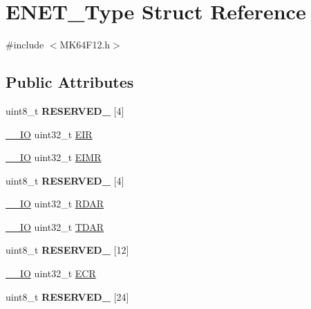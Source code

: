 \hypertarget{structENET__Type}{}\section{E\+N\+E\+T\+\_\+\+Type Struct Reference}
\label{structENET__Type}


{\ttfamily \#include $<$M\+K64\+F12.\+h$>$}

\subsection*{Public Attributes}
\begin{DoxyCompactItemize}
\item 
uint8\+\_\+t {\bfseries R\+E\+S\+E\+R\+V\+E\+D\+\_} \mbox{[}4\mbox{]}\hypertarget{structENET__Type_ad9777da88fb9892bd7c59a0a67fc3da0}{}\label{structENET__Type_ad9777da88fb9892bd7c59a0a67fc3da0}

\item 
\hyperlink{core__sc300_8h_aec43007d9998a0a0e01faede4133d6be}{\+\_\+\+\_\+\+IO} uint32\+\_\+t \hyperlink{structENET__Type_a2ff7649428a079dfb1cc80b9dd6ef26b}{E\+IR}
\item 
\hyperlink{core__sc300_8h_aec43007d9998a0a0e01faede4133d6be}{\+\_\+\+\_\+\+IO} uint32\+\_\+t \hyperlink{structENET__Type_ac8ca6627a6219451b62a04a55177367b}{E\+I\+MR}
\item 
uint8\+\_\+t {\bfseries R\+E\+S\+E\+R\+V\+E\+D\+\_} \mbox{[}4\mbox{]}\hypertarget{structENET__Type_a914cb8e3728f584f7ed798dd59a4c61c}{}\label{structENET__Type_a914cb8e3728f584f7ed798dd59a4c61c}

\item 
\hyperlink{core__sc300_8h_aec43007d9998a0a0e01faede4133d6be}{\+\_\+\+\_\+\+IO} uint32\+\_\+t \hyperlink{structENET__Type_aafd4d2fcc9b52fe5e9fb671cb3cbe8f7}{R\+D\+AR}
\item 
\hyperlink{core__sc300_8h_aec43007d9998a0a0e01faede4133d6be}{\+\_\+\+\_\+\+IO} uint32\+\_\+t \hyperlink{structENET__Type_aa4673b3f5276bced67de7715389a098f}{T\+D\+AR}
\item 
uint8\+\_\+t {\bfseries R\+E\+S\+E\+R\+V\+E\+D\+\_} \mbox{[}12\mbox{]}\hypertarget{structENET__Type_ab7b9abe9031c3a412673928570ea603e}{}\label{structENET__Type_ab7b9abe9031c3a412673928570ea603e}

\item 
\hyperlink{core__sc300_8h_aec43007d9998a0a0e01faede4133d6be}{\+\_\+\+\_\+\+IO} uint32\+\_\+t \hyperlink{structENET__Type_a0280ca4dba07c6a76901229ce4c885da}{E\+CR}
\item 
uint8\+\_\+t {\bfseries R\+E\+S\+E\+R\+V\+E\+D\+\_} \mbox{[}24\mbox{]}\hypertarget{structENET__Type_ab5cc3f1983e6e86edf72656886c64893}{}\label{structENET__Type_ab5cc3f1983e6e86edf72656886c64893}


\end{DoxyCompactItemize}
